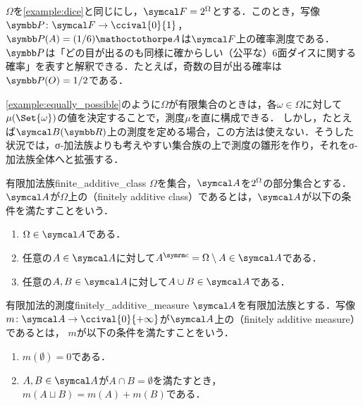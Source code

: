 \documentclass[../../main]{subfiles}
\begin{document}
\begin{example}\label{example:equally_possible}
  \(\Omega\)を\cref{example:dice}と同じにし，\(\sigmaalg{F}=\powerset{\Omega}\)とする．このとき，写像\(\prob\colon\sigmaalg{F}\to\ccival{0}{1}\)，\(\prob(A)=(1/6)\sizeof{A}\)は\(\sigmaalg{F}\)上の確率測度である．
  \(\prob\)は「どの目が出るのも同様に確からしい（公平な）6面ダイスに関する確率」を表すと解釈できる．たとえば，奇数の目が出る確率は\(\prob(O)=1/2\)である．
\end{example}

\cref{example:equally_possible}のように\(\Omega\)が有限集合のときは，各\(\omega\in\Omega\)に対して\(\mu(\Set{\omega})\)の値を決定することで，測度\(\mu\)を直に構成できる．
しかし，たとえば\(\sigmaalg{B}(\numset{R})\)上の測度を定める場合，この方法は使えない．そうした状況では，σ‐加法族よりも考えやすい集合族の上で測度の雛形を作り，それをσ‐加法族全体へと拡張する．

\begin{definition}{有限加法族}{finite_additive_class}
  \(\Omega\)を集合，\(\sigmaalg{A}\)を\(2^{\Omega}\)の部分集合とする．
  \(\sigmaalg{A}\)が\(\Omega\)上の（finitely additive class）であるとは，\(\sigmaalg{A}\)が以下の条件を満たすことをいう．
  \begin{enumerate}
    \item \(\Omega\in\sigmaalg{A}\)である．
    \item 任意の\(A\in\sigmaalg{A}\)に対して\(\scomp{A}=\Omega\setminus A\in\sigmaalg{A}\)である．
    \item 任意の\(A,B\in\sigmaalg{A}\)に対して\(A\cup B\in\sigmaalg{A}\)である．
  \end{enumerate}
\end{definition}

\begin{definition}{有限加法的測度}{finitely_additive_measure}
  \(\sigmaalg{A}\)を有限加法族とする．写像\(m\colon\sigmaalg{A}\to\ccival{0}{+\infty}\)が\(\sigmaalg{A}\)上の（finitely additive measure）であるとは，
  \(m\)が以下の条件を満たすことをいう．
  \begin{enumerate}
    \item \(m(\emptyset)=0\)である．
    \item \(A,B\in\sigmaalg{A}\)が\(A\cap B=\emptyset\)を満たすとき，\(m(A\sqcup B)=m(A)+m(B)\)である．
  \end{enumerate}
\end{definition}
\end{document}
